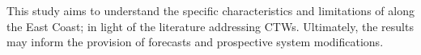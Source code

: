 This study aims to understand the specific characteristics and limitations of \BL{} along the East Coast; in light of the literature addressing CTWs.   Ultimately, the results may inform the provision of forecasts and prospective system modifications.











